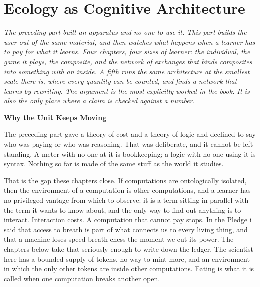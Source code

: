 \documentclass[12pt,openright,twoside]{book}
\theoremstyle{remark}
\theoremstyle{plain}
\theoremstyle{remark}
\theoremstyle{plain}
\theoremstyle{plain}
\begin{document}
\part{Ecology as Cognitive Architecture}
\label{part:ecology}

\vspace{1em}
\begin{mdframed}[backgroundcolor=remarkgray, linecolor=gray!60,
                 linewidth=1pt, topline=false, rightline=false,
                 bottomline=false]
\small\itshape
The preceding part built an apparatus and no one to use it.
This part builds the user out of the same material, and then watches what
happens when a learner has to pay for what it learns.
Four chapters, four sizes of learner: the individual, the game it plays,
the composite, and the network of exchanges that binds composites into
something with an inside.
A fifth runs the same architecture at the smallest scale there is, where
every quantity can be counted, and finds a network that learns by
rewriting.
The argument is the most explicitly worked in the book.
It is also the only place where a claim is checked against a number.
\end{mdframed}

\bigskip

{}
{\large\bfseries\color{accentblue} Why the Unit Keeps Moving}
\vspace{0.8em}

\noindent
The preceding part gave a theory of cost and a theory of logic and
declined to say who was paying or who was reasoning.
That was deliberate, and it cannot be left standing.
A meter with no one at it is bookkeeping; a logic with no one using it is
syntax.
Nothing so far is made of the same stuff as the world it studies.

That is the gap these chapters close.
If computations are ontologically isolated, then the environment of a
computation is other computations, and a learner has no privileged
vantage from which to observe: it is a term sitting in parallel with the
term it wants to know about, and the only way to find out anything is to
interact.
Interaction costs.
A computation that cannot pay stops.
In the Pledge i said that access to breath is part of what connects us to
every living thing, and that a machine loses speed breath chess the moment
we cut its power.
The chapters below take that seriously enough to write down the ledger.
The scientist here has a bounded supply of tokens, no way to mint more, and
an environment in which the only other tokens are inside other
computations.
Eating is what it is called when one computation breaks another open.
\end{document}
